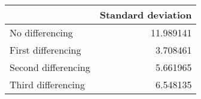 \begin{tabular}{lr}
\toprule
 & Standard deviation \\
\midrule
No differencing & 11.989141 \\
First differencing & 3.708461 \\
Second differencing & 5.661965 \\
Third differencing & 6.548135 \\
\bottomrule
\end{tabular}
